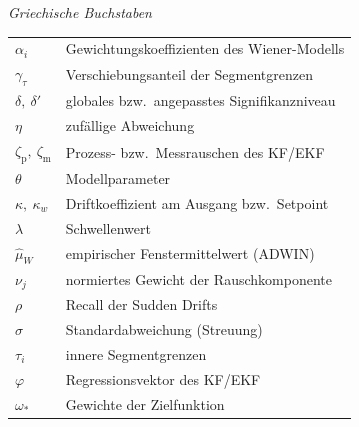 \noindent\textit{Griechische Buchstaben}
\begin{longtable}{@{}p{}p{}@{}}
    $\alpha_i$                                 & Gewichtungskoeffizienten des Wiener-Modells \\
    $\gamma_{\tau}$                            & Verschiebungsanteil der Segmentgrenzen \\
    $\delta,\ \delta'$                         & globales bzw.\ angepasstes Signifikanzniveau \\
    $\eta$                                     & zufällige Abweichung \\                  %
    $\zeta_{\mathrm{p}},\ \zeta_{\mathrm{m}}$  & Prozess- bzw.\ Messrauschen des KF/EKF \\
    $\theta$                                   & Modellparameter \\                       %
    $\kappa,\ \kappa_w$                        & Driftkoeffizient am Ausgang bzw.\ Setpoint \\
    $\lambda$                                  & Schwellenwert \\                         %
    $\hat{\mu}_W$                              & empirischer Fenstermittelwert (ADWIN) \\
    $\nu_j$                                    & normiertes Gewicht der Rauschkomponente \\
    $\rho$                                     & Recall der Sudden Drifts \\
    $\sigma$                                   & Standardabweichung (Streuung) \\         %
    $\tau_i$                                   & innere Segmentgrenzen \\
    $\varphi$                                  & Regressionsvektor des KF/EKF \\
    $\omega_{\ast}$                            & Gewichte der Zielfunktion \\
\end{longtable}

